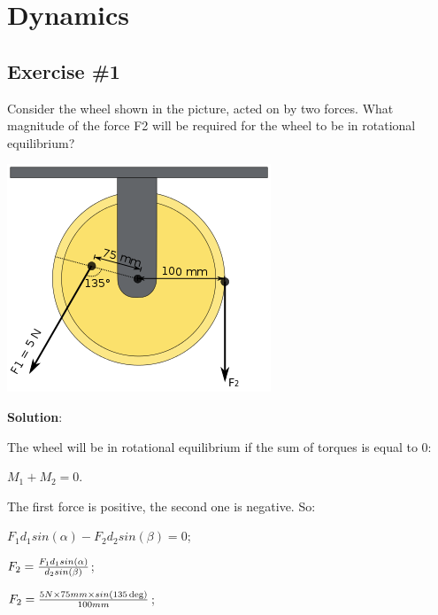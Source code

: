 \documentclass[a4paper,12pt]{article}
\begin{document}
    \section*{Dynamics}
        \subsection*{Exercise \#1}
    Consider the wheel shown in the picture, acted on by two forces. What
    magnitude of the force F2 will be required for the wheel to be in rotational
    equilibrium?

    \includegraphics{img/torque-angular-momentum-ex1.png}

    \textbf{Solution}:
        
        The wheel will be in rotational equilibrium if the sum of torques is equal to 0:

        \begin{center}$M_1 + M_2 = 0$.\end{center}

        The first force is positive, the second one is negative. So:

        \begin{center}
            $F_1 d_1 sin(\alpha) - F_2 d_2 sin(\beta) = 0$;
            
            $F_2 = {F_1 d_1 sin(\alpha) \over d_2 sin(\beta)}$;

            $F_2 = {5N \times 75mm \times sin(135 \deg) \over 100mm}$;
        \end{center}
\end{document}
